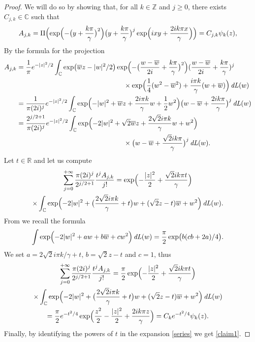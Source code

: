 \documentclass[10pt]{amsart}
\DeclareMathOperator{\dL}{\mathit{dL}}
\theoremstyle{definition}
\let\EE\exp
\let\ov\overline
\newcommand\C{\mathbb C}
\newcommand\R{\mathbb R}
\newcommand\Z{\mathbb Z}
\begin{document}
\begin{proof}
We will do so by showing that, for all $k \in \Z$ and $j \geq 0$, there exists $C_{j,k} \in \C$ such that
\begin{equation}\label{claim1}
A_{j,k}=\Pi\Bigl(\EE\Bigl({-\bigl(y+\frac{k \pi}\gamma\bigr)^2}\Bigr) \bigl(y+\frac{k \pi}\gamma\bigr)^j \EE\Bigl({ixy+\frac{2ik\pi x}{\gamma} } \Bigr)\Bigr)= C_{j,k} \psi_k(z),
\end{equation}
By the formula for the projection
\begin{align*}
A_{j,k}
&= \frac{1}{\pi} e^{-|z|^2/2} \int_\mathbb{C} \EE\bigl({\ov w z - |w|^2/2}\bigr) \EE\Bigl({-\bigl(\frac{w -\ov w}{2i}+\frac{k \pi}\gamma\bigr)^2} \Bigr)(\frac{w -\ov w}{2i}+\frac{k \pi}\gamma)^j \\
&\hspace{5.5cm}\times \EE\Bigl({\frac14(w^2-\ov w^2) +\frac{i \pi k}{\gamma}(w+\ov w)} \Bigr) \dL(w)\\
&= \frac{1}{\pi (2i)^j} e^{-|z|^2/2} \int_\mathbb{C} \EE \Bigl({-|w|^2 + \ov w z +\frac{2i \pi k}{\gamma} w+\frac12 w^2 } \Bigr) \bigl({w -\ov w}+\frac{2i k \pi}\gamma\bigr)^j \dL(w)\\
&= \frac{2^{j/2+1}}{\pi (2i)^j} e^{-|z|^2/2} \int_\mathbb{C} \EE\Bigl({-2|w|^2 + \sqrt{2}\ov w z +\frac{2 \sqrt{2}i \pi k}{\gamma} w+ w^2 } \Bigr) \\
&\hspace{5.5cm}\times \bigl({w -\ov w}+\frac{\sqrt{2}i k \pi}\gamma\bigr)^j \dL(w).
\end{align*}
Let $t\in \R$ and let us compute
\begin{multline*}
\sum_{j=0}^{+\infty} \frac{\pi (2i)^j}{2^{j/2+1}}\frac{t^j A_{j,k}}{j!}=\EE\Bigl(-\frac{|z|^2}2 + \frac{\sqrt{2}i k \pi t } \gamma \Bigr)\\
\times \int_\mathbb{C} \EE\Bigl({-2|w|^2 +\bigl(\frac{2 \sqrt{2}i \pi k}{\gamma} +t\bigr)w + (\sqrt{2}z-t)\ov w + w^2 } \Bigr) \dL(w).
\end{multline*}
From \cite[\S 6]{GGT} we recall the formula
\begin{equation*}
\int \EE\Bigl(-2 |w|^2 + aw + b\overline{w} + cw^2 \Bigr)\dL(w)
= \frac{\pi}{2} \EE\bigl({b(cb+2a)}/{4}\bigr).
\end{equation*}
We set $a={2 \sqrt{2}i \pi k}/{\gamma} +t$, $b=\sqrt{2}z-t$ and $c=1$, thus
\begin{multline}\label{series}
\sum_{j=0}^{+\infty} \frac{\pi (2i)^j}{2^{j/2+1}}\frac{t^j A_{j,k}}{j!}=\frac{\pi}{2} \EE\Bigl(-\frac{|z|^2}2 + \frac{\sqrt{2}i k \pi t } \gamma \Bigr)\\
\times \int_\mathbb{C} \EE\Bigl({-2|w|^2 +\bigl(\frac{2 \sqrt{2}i \pi k}{\gamma} +t\bigr)w + (\sqrt{2}z-t)\ov w + w^2 } \Bigr) \dL(w) \\
= \frac{\pi}{2} e^{- t^2/4} \EE\Bigl({\frac{z^2}{2}-\frac{|z|^2}2+\frac{2i k\pi z}{\gamma}}\Bigr) = C_k e^{-t^2/4}\psi_k(z).
\end{multline}
Finally, by identifying the powers of $t$ in the expansion \eqref{series} we get \eqref{claim1}.
\end{proof}
\end{document}
